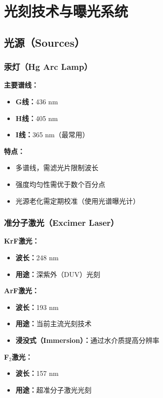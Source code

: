 \documentclass[UTF8,12pt,a4paper]{ctexart}
\begin{document}
\section{光刻技术与曝光系统}

\subsection{光源（Sources）}

\subsubsection{汞灯（Hg Arc Lamp）}

\textbf{主要谱线：}
\begin{itemize}
    \item \textbf{G线：}436 nm
    \item \textbf{H线：}405 nm
    \item \textbf{I线：}365 nm（最常用）
\end{itemize}

\textbf{特点：}
\begin{itemize}
    \item 多谱线，需滤光片限制波长
    \item 强度均匀性需优于数个百分点
    \item 光源老化需定期校准（使用光谱曝光计）
\end{itemize}

\subsubsection{准分子激光（Excimer Laser）}

\textbf{KrF激光：}
\begin{itemize}
    \item \textbf{波长：}248 nm
    \item \textbf{用途：}深紫外（DUV）光刻
\end{itemize}

\textbf{ArF激光：}
\begin{itemize}
    \item \textbf{波长：}193 nm
    \item \textbf{用途：}当前主流光刻技术
    \item \textbf{浸没式（Immersion）：}通过水介质提高分辨率
\end{itemize}

\textbf{F$_2$激光：}
\begin{itemize}
    \item \textbf{波长：}157 nm
    \item \textbf{用途：}超准分子激光光刻
\end{itemize}
\end{document}
